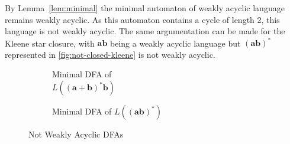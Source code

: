 By Lemma~\autoref{lem:minimal} the minimal automaton of weakly acyclic language remains weakly acyclic. As this automaton contains a cycle of length 2, this language is not weakly acyclic. The same argumentation can be made for the Kleene star closure, with $\bm{ab}$ being a weakly acyclic language but $\bm{(ab)^{*}}$ represented in \autoref{fig:not-closed-kleene} is not weakly acyclic. 

\begin{figure}[H]
\centering 
	\begin{subfigure}{.30\textwidth}	
		\centering 
    	\centering 
    	\caption{Minimal DFA of \\ $L(\bm{(a + b)^{*}b})$}\label{fig:not-closed-concat}
    \end{subfigure}
    \begin{subfigure}{.60\textwidth}
	\centering 
    	\caption{Minimal DFA of $L(\bm{(ab)^{*}})$}\label{fig:not-closed-kleene}
    \end{subfigure}
     \caption{Not Weakly Acyclic DFAs}\label{fig:notwa}
\end{figure}
